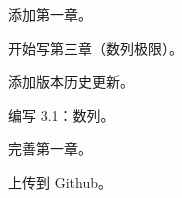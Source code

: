 \documentclass[lang=cn,10pt]{template}
\begin{document}
\begin{change}
  \item 添加第一章。
  \item 开始写第三章（数列极限）。
\end{change}

\begin{change}
  \item 添加版本历史更新。
  \item 编写 3.1：数列。
\end{change}

\begin{change}
  \item 完善第一章。
  \item 上传到 Github。
\end{change}
\end{document}
